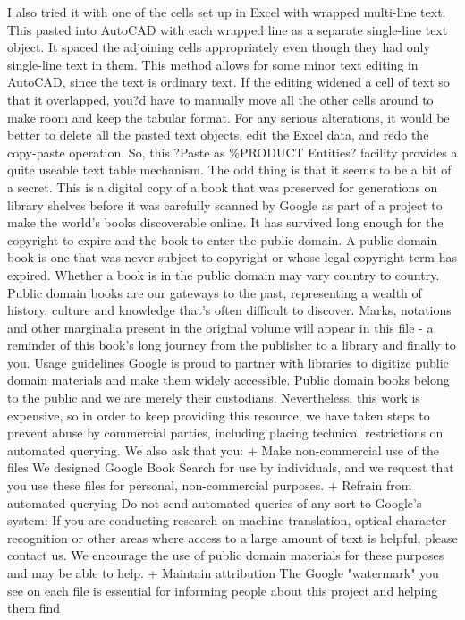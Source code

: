 \documentclass[a4paper]{article}
\begin{document}
I also tried it with one of the cells set up in Excel with wrapped multi-line text. This pasted into AutoCAD with each wrapped line as a separate single-line text object. It spaced the adjoining cells appropriately even though they had only single-line text in them.
This method allows for some minor text editing in AutoCAD, since the text is ordinary text. If the editing widened a cell of text so that it overlapped, you?d have to manually move all the other cells around to make room and keep the tabular format. For any serious alterations, it would be better to delete all the pasted text objects, edit the Excel data, and redo the copy-paste operation.
So, this ?Paste as \%PRODUCT Entities? facility provides a quite useable text table mechanism. The odd thing is that it seems to be a bit of a secret.
This is a digital copy of a book that was preserved for generations on library shelves before it was carefully scanned by Google as part of a project 
to make the world's books discoverable online. 
It has survived long enough for the copyright to expire and the book to enter the public domain. A public domain book is one that was never subject 
to copyright or whose legal copyright term has expired. Whether a book is in the public domain may vary country to country. Public domain books 
are our gateways to the past, representing a wealth of history, culture and knowledge that's often difficult to discover. 
Marks, notations and other marginalia present in the original volume will appear in this file - a reminder of this book's long journey from the 
publisher to a library and finally to you. 
Usage guidelines 
Google is proud to partner with libraries to digitize public domain materials and make them widely accessible. Public domain books belong to the 
public and we are merely their custodians. Nevertheless, this work is expensive, so in order to keep providing this resource, we have taken steps to 
prevent abuse by commercial parties, including placing technical restrictions on automated querying. 
We also ask that you: 
+ Make non-commercial use of the files We designed Google Book Search for use by individuals, and we request that you use these files for 
personal, non-commercial purposes. 
+ Refrain from automated querying Do not send automated queries of any sort to Google's system: If you are conducting research on machine 
translation, optical character recognition or other areas where access to a large amount of text is helpful, please contact us. We encourage the 
use of public domain materials for these purposes and may be able to help. 
+ Maintain attribution The Google "watermark" you see on each file is essential for informing people about this project and helping them find 
\end{document}
